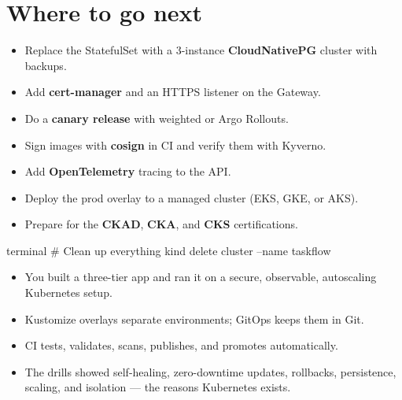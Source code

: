 \section{Where to go next}

\begin{itemize}
  \item Replace the StatefulSet with a 3-instance \textbf{CloudNativePG} cluster with backups.
  \item Add \textbf{cert-manager} and an HTTPS listener on the Gateway.
  \item Do a \textbf{canary release} with weighted  or Argo Rollouts.
  \item Sign images with \textbf{cosign} in CI and verify them with Kyverno.
  \item Add \textbf{OpenTelemetry} tracing to the API.
  \item Deploy the prod overlay to a managed cluster (EKS, GKE, or AKS).
  \item Prepare for the \textbf{CKAD}, \textbf{CKA}, and \textbf{CKS} certifications.
\end{itemize}

\begin{bashcode}{terminal}
# Clean up everything
kind delete cluster --name taskflow
\end{bashcode}

\begin{recap}
\begin{itemize}
  \item You built a three-tier app and ran it on a secure, observable,
        autoscaling Kubernetes setup.
  \item Kustomize overlays separate environments; GitOps keeps them in Git.
  \item CI tests, validates, scans, publishes, and promotes automatically.
  \item The drills showed self-healing, zero-downtime updates, rollbacks,
        persistence, scaling, and isolation --- the reasons Kubernetes exists.
\end{itemize}
\end{recap}
